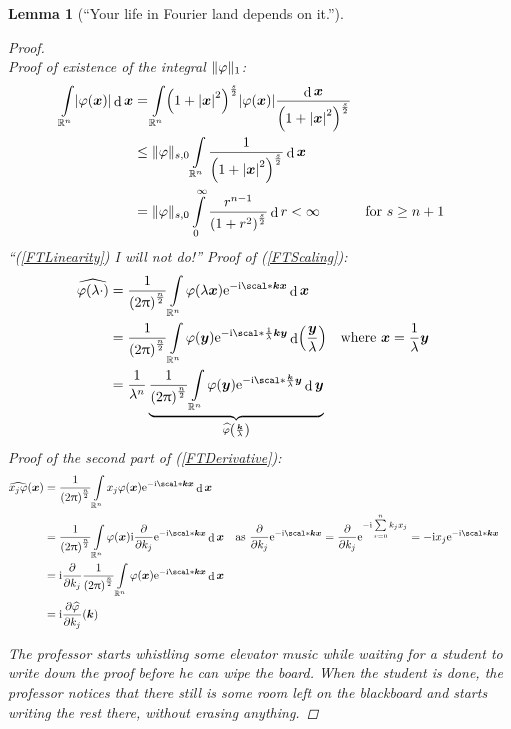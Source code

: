 \documentclass[10pt]{article}
\newtheorem*{lemma}{Lemma}
\DeclarePairedDelimiter\norm{\Vert}{\Vert}
\DeclarePairedDelimiter\abs{\lvert}{\rvert}
\DeclarePairedDelimiter\of{\lparen}{\rparen}
\newcommand{\R}{\mathbb{R}}
\newcommand{\Rn}{{\R^n}}
\DeclareMathOperator{\diffd}{d}
\newcommand\gl\lambda
\newcommand\gj\varphi
\newcommand{\bx}{{\vectorsym x}}
\newcommand{\by}{{\vectorsym y}}
\newcommand{\bk}{{\vectorsym k}}
\newcommand\ft\widehat
\newcommand\Int[1]{\int\limits_#1}
\newcommand{\Sum}{\sum\limits}
\newcommand\fstpartial[2][]{\frac{\partial #1}{\partial #2}}
\newcommand\I{\mathrm{i}}
\newcommand\E{\mathrm{e}}
\newcommand{\ftnrm}{\frac{1}{\of*{2\pi}^\frac{n}{2}} }
\begin{document}
\begin{lemma}[``Your life in Fourier land depends on it.'']
\begin{proof}
\begin{equation*}
      \end{equation*}
      Proof of existence of the integral $\norm\gj_1$:
      \begin{align*}
        \Int\Rn\abs*{\gj\of*\bx}\diffd\bx 
        &= \Int\Rn\of*{1+\abs*{\bx}^2}^\frac{s}{2}\abs*{\gj\of*\bx}
        \frac{\diffd\bx}{\of*{1+\abs*{\bx}^2}^\frac{s}{2}}  \\
        &\leq \norm{\gj}_{s,0} \Int\Rn\frac{1}{\of*{1+\abs*{\bx}^2}^\frac{s}{2}}\diffd\bx\\
        &= \norm{\gj}_{s,0} \Int0^\infty\frac{r^{n-1}}{\of*{1+r^2}^\frac{s}{2}}\diffd r
        < \infty &&\text{for } s\geq n+1
      \end{align*}
      ``(\ref{FTLinearity}) I will not do!''
      Proof of (\ref{FTScaling}):
      \begin{align*}
        \ft{\gj\of*{\gl\cdot}} 
        &= \ftnrm\Int\Rn\gj\of*{\gl\bx}\E^{-\I\scal*\bk\bx} \diffd\bx \\
        &= \frac{1}{\of*{2\pi}^\frac{n}{2}}
          \Int\Rn\gj\of*\by\E^{-\I\scal*{\frac 1\gl\bk}{\by}} \diffd\of*{\frac{\by}{\gl}}
          && \text{where } \bx=\frac{1}{\gl}\by \\
        &= \frac{1}{\gl^n} \underbrace{
          \ftnrm\Int\Rn\gj\of*\by\E^{-\I\scal*{\frac\bk\gl}\by}
          \diffd\by}_{\ft\gj\of*{\frac\bk{\gl}}}
      \end{align*}
      Proof of the second part of (\ref{FTDerivative}):
      \begin{align*}
        \ft{x_j\gj}\of*\bx 
        &= \ftnrm\Int\Rn x_j\gj\of*{\bx}\E^{-\I\scal*\bk\bx}\diffd\bx \\
        &= \ftnrm
          \Int\Rn\gj\of*{\bx}\I\fstpartial{k_j}\E^{-\I\scal*\bk\bx} \diffd\bx 
          && \text{as }\fstpartial{k_j}\E^{-\I\scal*\bk\bx} =
            \fstpartial{k_j}\E^{-\I\Sum_{r=0}^n k_j x_j}=-\I x_j \E^{-\I\scal*\bk\bx}\\
        &= \I\fstpartial{k_j}\ftnrm
          \Int\Rn\gj\of*\bx\E^{-\I\scal*\bk\bx} \diffd\bx \\
        &= \I\fstpartial[\ft\gj]{k_j}\of*\bk
      \end{align*}
      
      \emph{The professor starts whistling some elevator music while waiting for a student to write down the proof before he can wipe the board. When the student is done, the professor notices that there still is some room left on the blackboard and starts writing the rest there, without erasing anything.}
      

\end{proof}
\end{lemma}
\end{document}
